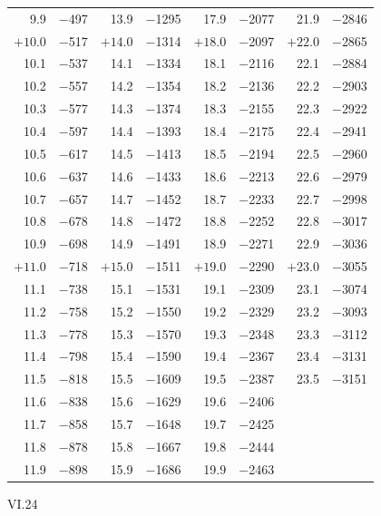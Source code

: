 \documentclass[10pt,a4paper]{article}
\begin{document}
\begin{center}
\begin{longtable}{@{}rrrrrrrr@{}}
9.9 & $-$497 & 13.9 & $-$1295 & 17.9 & $-$2077 & 21.9 & $-$2846 \\
$+10.0$ & $-$517 & $+14.0$ & $-$1314 & $+18.0$ & $-$2097 & $+22.0$ & $-$2865 \\
10.1 & $-$537 & 14.1 & $-$1334 & 18.1 & $-$2116 & 22.1 & $-$2884 \\
10.2 & $-$557 & 14.2 & $-$1354 & 18.2 & $-$2136 & 22.2 & $-$2903 \\
10.3 & $-$577 & 14.3 & $-$1374 & 18.3 & $-$2155 & 22.3 & $-$2922 \\
10.4 & $-$597 & 14.4 & $-$1393 & 18.4 & $-$2175 & 22.4 & $-$2941 \\
10.5 & $-$617 & 14.5 & $-$1413 & 18.5 & $-$2194 & 22.5 & $-$2960 \\
10.6 & $-$637 & 14.6 & $-$1433 & 18.6 & $-$2213 & 22.6 & $-$2979 \\
10.7 & $-$657 & 14.7 & $-$1452 & 18.7 & $-$2233 & 22.7 & $-$2998 \\
10.8 & $-$678 & 14.8 & $-$1472 & 18.8 & $-$2252 & 22.8 & $-$3017 \\
10.9 & $-$698 & 14.9 & $-$1491 & 18.9 & $-$2271 & 22.9 & $-$3036 \\
$+11.0$ & $-$718 & $+15.0$ & $-$1511 & $+19.0$ & $-$2290 & $+23.0$ & $-$3055 \\
11.1 & $-$738 & 15.1 & $-$1531 & 19.1 & $-$2309 & 23.1 & $-$3074 \\
11.2 & $-$758 & 15.2 & $-$1550 & 19.2 & $-$2329 & 23.2 & $-$3093 \\
11.3 & $-$778 & 15.3 & $-$1570 & 19.3 & $-$2348 & 23.3 & $-$3112 \\
11.4 & $-$798 & 15.4 & $-$1590 & 19.4 & $-$2367 & 23.4 & $-$3131 \\
11.5 & $-$818 & 15.5 & $-$1609 & 19.5 & $-$2387 & 23.5 & $-$3151 \\
11.6 & $-$838 & 15.6 & $-$1629 & 19.6 & $-$2406 & & \\
11.7 & $-$858 & 15.7 & $-$1648 & 19.7 & $-$2425 & & \\
11.8 & $-$878 & 15.8 & $-$1667 & 19.8 & $-$2444 & & \\
11.9 & $-$898 & 15.9 & $-$1686 & 19.9 & $-$2463 & & \\\end{longtable}
\end{center}

\vspace{1em}
\noindent\textsc{VI.}\hfill 24
\end{document}
